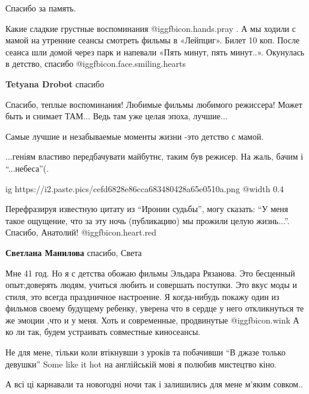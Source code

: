 \begin{itemize}
Спасибо за память.

Какие сладкие грустные воспоминания @igg{fbicon.hands.pray} .
А мы ходили с мамой на утренние сеансы смотреть фильмы в «Лейпциг». Билет 10 коп.
После сеанса шли домой через парк и напевали «Пять минут, пять минут..».
Окунулась в детство, спасибо @igg{fbicon.face.smiling.hearts} 

\textbf{Tetyana Drobot} спасибо


Спасибо, теплые воспоминания! Любимые фильмы любимого режиссера! Может быть и
снимает ТАМ... Ведь там уже целая эпоха, лучшие...

Самые лучшие и незабываемые моменты жизни -это детство с мамой.


...геніям властиво передбачувати майбутнє, таким був режисер. На жаль, бачим і
\enquote{...небеса}(.


\ifcmt
  ig https://i2.paste.pics/cefd6828e86cca683480428a65e0510a.png
  @width 0.4
\fi


Перефразируя известную цитату из \enquote{Иронии судьбы}, могу сказать: \enquote{У меня такое
ощущение, что за эту ночь (публикацию) мы прожили целую жизнь...}. Спасибо,
Анатолий! @igg{fbicon.heart.red}

\begin{itemize} %
\textbf{Светлана Манилова} спасибо, Света
\end{itemize} %

Мне 41 год.
Но я с детства обожаю фильмы Эльдара Рязанова. Это бесценный опыт:доверять людям, учиться любить и совершать поступки.
Это вкус моды и стиля, это всегда праздничное настроение.
Я когда-нибудь покажу один из фильмов своему будущему ребенку, уверена что в сердце у него откликнуться те же эмоции ,что и у меня.
Хоть и современные, продвинутые @igg{fbicon.wink} 
А ко ли так, будем устраивать совместные киносеансы.


Не для мене, тільки коли втікнувши з уроків та побачивши \enquote{В джазе только
девушки} Some like it hot на англійській мові я полюбив мистецтво кіно.

А всі ці карнавали та новогодні ночи так і залишились для мене м'яким совком..


\end{itemize}
